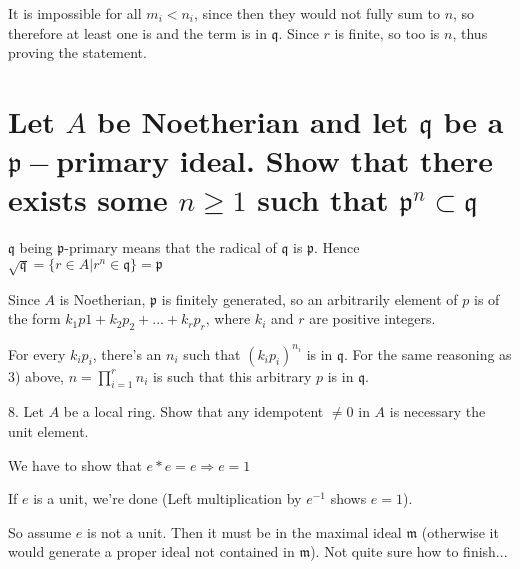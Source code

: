 \documentclass{article}
\begin{document}
It is impossible for all $m_i < n_i$, since then they would not fully sum to $n$, so therefore at least one is and the term is in $\mathfrak{q}$. Since $r$ is finite, so too is $n$, thus proving the statement.

\section{Let $A$ be Noetherian and let $\mathfrak{q}$ be a $\mathfrak{p}-$primary ideal. Show that there exists some $n \ge 1$ such that $\mathfrak{p}^n \subset \mathfrak{q}$}

$\mathfrak{q}$ being $\mathfrak{p}$-primary means that the radical of $\mathfrak{q}$ is $\mathfrak{p}$. Hence $\sqrt{\mathfrak{q}} = \{r \in A | r^n \in \mathfrak{q}\} = \mathfrak{p}$

Since $A$ is Noetherian, $\mathfrak{p}$ is finitely generated, so an arbitrarily element of $p$ is of the form $k_1 p1 + k_2 p_2 + ... + k_r p_r$, where $k_i$ and $r$ are positive integers. 
 
For every $k_i p_i$, there's an $n_i$ such that $(k_i p_i)^{n_i}$ is in $\mathfrak{q}$. For the same reasoning as 3) above, $n=\prod_{i=1}^{r} n_i$ is such that this arbitrary $p$ is in $\mathfrak{q}$.

\break
\break

8. Let $A$ be a local ring. Show that any idempotent $\ne 0$ in $A$ is necessary the unit element. 

We have to show that $e * e = e \Rightarrow e = 1$

If $e$ is a unit, we're done (Left multiplication by $e^{-1}$ shows $e = 1$).

So assume $e$ is not a unit. Then it must be in the maximal ideal $\mathfrak{m}$ (otherwise it would generate a proper ideal not contained in $\mathfrak{m}$). Not quite sure how to finish...
\end{document}
